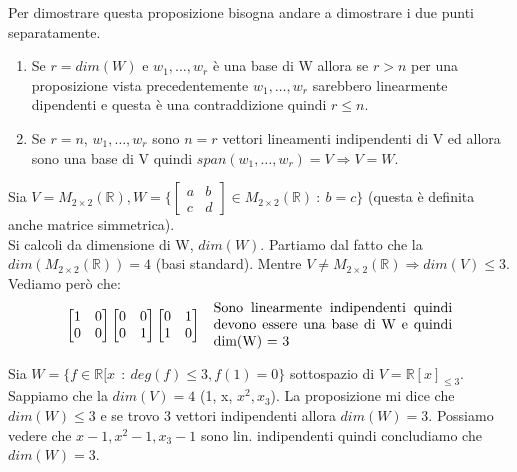 \begin{demostration}
Per dimostrare questa proposizione bisogna andare a dimostrare i due punti separatamente.
\begin{enumerate}
    \item Se $r = dim(W)$ e $w_1, \ldots, w_r$ è una base di W allora se $r > n$ per una proposizione vista precedentemente $w_1, \ldots, w_r$ sarebbero linearmente dipendenti e questa è una contraddizione quindi $r\leq n$.
    \item Se $r = n$, $w_1, \ldots, w_r$ sono $n = r$ vettori lineamenti indipendenti di V ed allora sono una base di V quindi $span(w_1, \ldots, w_r) = V \Longrightarrow V = W$.
\end{enumerate}
\end{demostration}

\begin{example}
Sia $V = M_{2 \times 2}(\mathbb{R}), W = \{\begin{bmatrix}a & b \\ c & d\end{bmatrix} \in M_{2 \times 2}(\mathbb{R}) \::\: b = c\}$ (questa è definita anche matrice simmetrica).\\
Si calcoli da dimensione di W, $dim(W)$. Partiamo dal fatto che la $dim(M_{2 \times 2}(\mathbb{R})) = 4$ (basi standard). Mentre $V \neq M_{2 \times 2}(\mathbb{R})  \Longrightarrow dim(V) \leq 3$. Vediamo però che:
\[
\begin{bmatrix}1 & 0 \\ 0 & 0\end{bmatrix}
\begin{bmatrix}0 & 0 \\ 0 & 1\end{bmatrix}
\begin{bmatrix}0 & 1 \\ 1 & 0\end{bmatrix}
\hspace{.3cm}
\parbox{6cm}{Sono linearmente indipendenti quindi devono essere una base di W e quindi dim(W) = 3}
\]
\end{example}

\begin{example}
Sia $W = \{f \in \mathbb{R}[x\ \::\: deg(f) \leq 3, f(1) = 0\}$ sottospazio di $V = \mathbb{R}[x]_{\leq 3}$. Sappiamo che la $dim(V) = 4$ (1, x, $x^2, x_3$). La proposizione mi dice che $dim(W) \leq 3$ e se trovo 3 vettori indipendenti allora $dim(W) = 3$. Possiamo vedere che $x-1, x^2-1, x_3-1$ sono lin. indipendenti quindi concludiamo che $dim(W) = 3$.
\end{example}

